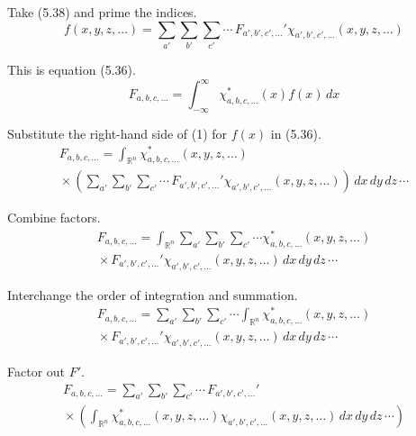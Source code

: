 


\bigskip
Take (5.38) and prime the indices.
\begin{equation*}
f(x,y,z,\ldots)=\sum_{a'}\sum_{b'}\sum_{c'}\cdots\,F_{a',b',c',\ldots}'\chi_{a',b',c',\ldots}(x,y,z,\ldots)
\tag{1}
\end{equation*}

This is equation (5.36).
\begin{equation*}
F_{a,b,c,\ldots}=\int_{-\infty}^\infty \chi_{a,b,c,\ldots}^*(x)f(x)\,dx
\tag{5.36}
\end{equation*}

Substitute the right-hand side of (1) for $f(x)$ in (5.36).
\begin{multline*}
F_{a,b,c,\ldots}
=\int_{\mathbb R^n}\chi_{a,b,c,\ldots}^*(x,y,z,\ldots)
\\
{}\times\left(\sum_{a'}\sum_{b'}\sum_{c'}\cdots\,F_{a',b',c',\ldots}'\chi_{a',b',c',\ldots}(x,y,z,\ldots)\right)
\,dx\,dy\,dz\,\cdots
\end{multline*}

Combine factors.
\begin{multline*}
F_{a,b,c,\ldots}
=\int_{\mathbb R^n}
\sum_{a'}\sum_{b'}\sum_{c'}\cdots
\chi_{a,b,c,\ldots}^*(x,y,z,\ldots)
\\
{}\times
F_{a',b',c',\ldots}'
\chi_{a',b',c',\ldots}(x,y,z,\ldots)
\,dx\,dy\,dz\,\cdots
\end{multline*}

Interchange the order of integration and summation.
\begin{multline*}
F_{a,b,c,\ldots}
=\sum_{a'}\sum_{b'}\sum_{c'}\cdots\int_{\mathbb R^n}
\chi_{a,b,c,\ldots}^*(x,y,z,\ldots)
\\
{}\times
F_{a',b',c',\ldots}'
\chi_{a',b',c',\ldots}(x,y,z,\ldots)
\,dx\,dy\,dz\,\cdots
\end{multline*}

Factor out $F'$.
\begin{multline*}
F_{a,b,c,\ldots}
=\sum_{a'}\sum_{b'}\sum_{c'}\cdots\,F_{a',b',c',\ldots}'
\\
{}\times\left(
\int_{\mathbb R^n}
\chi_{a,b,c,\ldots}^*(x,y,z,\ldots)
\chi_{a',b',c',\ldots}(x,y,z,\ldots)
\,dx\,dy\,dz\,\cdots
\right)
\end{multline*}

